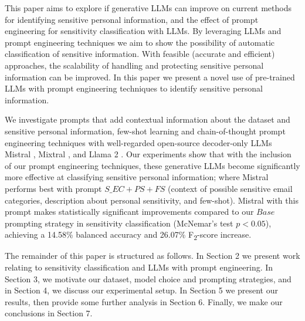 This paper aims to explore if generative LLMs can improve on current methods for identifying sensitive personal information, and the effect of prompt engineering for sensitivity classification with LLMs. By leveraging LLMs and prompt engineering techniques we aim to show the possibility of automatic classification of sensitive information. With feasible (accurate and efficient) approaches, the scalability of handling and protecting sensitive personal information can be improved. In this paper we present a novel use of pre-trained LLMs with prompt engineering techniques to identify sensitive personal information.

We investigate prompts that add contextual information about the dataset and sensitive personal information, few-shot learning and chain-of-thought prompt engineering techniques with well-regarded open-source decoder-only LLMs Mistral \cite{jiang2023mistral}, Mixtral \cite{jiang2024mixtral}, and Llama 2 \cite{touvron2023llama}. Our experiments show that with the inclusion of our prompt engineering techniques, these generative LLMs become significantly more effective at classifying sensitive personal information; where Mistral performs best with prompt $S\_EC+PS+FS$ (context of possible sensitive email categories, description about personal sensitivity, and few-shot). Mistral with this prompt makes statistically significant improvements compared to our $Base$ prompting strategy in sensitivity classification (McNemar's test $p<0.05$), achieving a 14.58\% balanced accuracy and 26.07\% F\textsubscript{2}-score increase.

The remainder of this paper is structured as follows. In Section 2 we present work relating to sensitivity classification and LLMs with prompt engineering. In Section 3, we motivate our dataset, model choice and prompting strategies, and in Section 4, we discuss our experimental setup. In Section 5 we present our results, then provide some further analysis in Section 6. Finally, we make our conclusions in Section 7.
